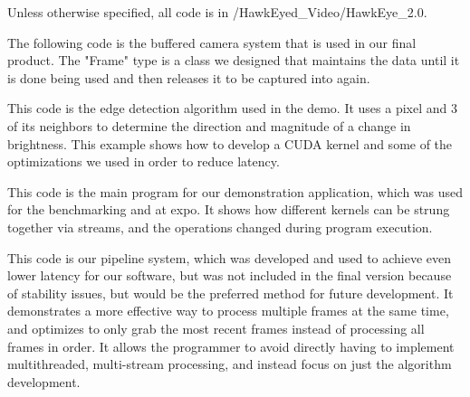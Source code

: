 %
Unless otherwise specified, all code is in /HawkEyed\_Video/HawkEye\_2.0.\\
\par
The following code is the buffered camera system that is used in our final product.
The "Frame" type is a class we designed that maintains the data until it is done being used
and then releases it to be captured into again.\\

\par
This code is the edge detection algorithm used in the demo. It uses a pixel and 3 of its neighbors
to determine the direction and magnitude of a change in brightness. This example shows how to develop a
CUDA kernel and some of the optimizations we used in order to reduce latency.\\

\par
This code is the main program for our demonstration application, which was used for the benchmarking
and at expo. It shows how different kernels can be strung together via streams, and the operations changed during
program execution.\\

\par
This code is our pipeline system, which was developed and used to achieve even lower latency  for our software, but 
was not included in the final version because of stability issues, but would be the preferred method for future development.
It demonstrates a more effective way to process multiple frames at the same time, and optimizes to only grab the most
recent frames instead of processing all frames in order. It allows the programmer to avoid directly having to implement 
multithreaded, multi-stream processing, and instead focus on just the algorithm development.\\
